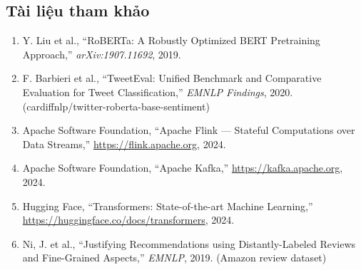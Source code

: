 \subsection*{Tài liệu tham khảo}

\begin{enumerate}
    \item Y. Liu et al., ``RoBERTa: A Robustly Optimized BERT Pretraining Approach,'' \textit{arXiv:1907.11692}, 2019.
    \item F. Barbieri et al., ``TweetEval: Unified Benchmark and Comparative Evaluation for Tweet Classification,'' \textit{EMNLP Findings}, 2020. (cardiffnlp/twitter-roberta-base-sentiment)
    \item Apache Software Foundation, ``Apache Flink --- Stateful Computations over Data Streams,'' \url{https://flink.apache.org}, 2024.
    \item Apache Software Foundation, ``Apache Kafka,'' \url{https://kafka.apache.org}, 2024.
    \item Hugging Face, ``Transformers: State-of-the-art Machine Learning,'' \url{https://huggingface.co/docs/transformers}, 2024.
    \item Ni, J. et al., ``Justifying Recommendations using Distantly-Labeled Reviews and Fine-Grained Aspects,'' \textit{EMNLP}, 2019. (Amazon review dataset)
\end{enumerate}
